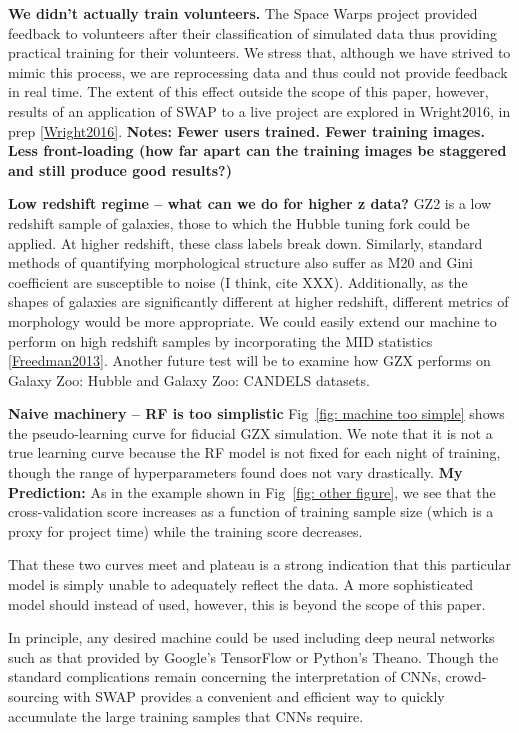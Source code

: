 \documentclass[twocolumn]{aastex6}
\begin{document}
\textbf{We didn't actually train volunteers.}
The Space Warps project provided feedback to volunteers after their classification
of simulated data thus providing practical training for their volunteers. We stress 
that, although we have strived to mimic this process, we are reprocessing data and
thus could not provide feedback in real time. The extent of this effect outside the scope
of this paper, however, results of an application of SWAP to a live project 
are explored in Wright2016, in prep \ref{Wright2016}. 
\textbf{Notes: Fewer users trained. Fewer training images. 
Less front-loading (how far apart can the training images be staggered and still produce good results?)}


\textbf{Low redshift regime -- what can we do for higher z data?}
GZ2 is a low redshift sample of galaxies, those to which the Hubble tuning fork 
could be applied. At higher redshift, these class labels break down. 
Similarly, standard methods of quantifying morphological structure also 
suffer as M20 and Gini coefficient are susceptible to noise (I think, cite XXX).
Additionally, as the shapes of galaxies are significantly different at higher 
redshift, different metrics of morphology would be more appropriate. 
We could easily extend our machine to perform on high redshift samples
by incorporating the MID statistics \ref{Freedman2013}. Another future
test will be to examine how GZX performs on Galaxy Zoo: Hubble and 
Galaxy Zoo: CANDELS datasets. 

\textbf{Naive machinery -- RF is too simplistic}
Fig~\ref{fig: machine too simple} shows the pseudo-learning curve for fiducial
GZX simulation. We note that it is not a true learning curve because the RF 
model is not fixed for each night of training, though the range of hyperparameters
found does not vary drastically. \textbf{My Prediction:} As in the example shown
in Fig~\ref{fig: other figure}, we see that the cross-validation score increases as a
function of training sample size (which is a proxy for project time) while the training score decreases. 

That these two curves meet and plateau is a strong indication that this particular
model is simply unable to adequately reflect the data. A more sophisticated model 
should instead of used, however, this is beyond the scope of this paper. 

In principle, any desired machine could be used including deep neural networks such 
as that provided by Google's TensorFlow or Python's Theano. Though the standard 
complications remain concerning the interpretation of CNNs, crowd-sourcing with
SWAP provides a convenient and efficient way to quickly accumulate the large training 
samples that CNNs require.  
\end{document}
